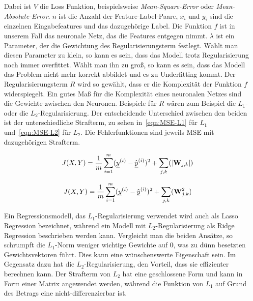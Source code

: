 Dabei ist \(V\) die Loss Funktion, beispielsweise \textit{Mean-Square-Error} oder \textit{Mean-Absolute-Error}.
\(n\) ist die Anzahl der Feature-Label-Paare,
\(x_i\) und \(y_i\) sind die einzelnen Eingabefeatures und das dazugehörige Label.
Die Funktion \(f\) ist in unserem Fall das neuronale Netz, das die Features entgegen nimmt.
\(\lambda\) ist ein Parameter, der die Gewichtung des Regularisierungsterm festlegt.
Wählt man diesen Parameter zu klein, so kann es sein, dass das Modell trotz Regularisierung noch immer overfittet.
Wählt man ihn zu groß, so kann es sein, dass das Modell das Problem nicht mehr korrekt abbildet und es zu Underfitting kommt.
Der Regularisierungsterm \(R\) wird so gewählt, dass er die Komplexität der Funktion \(f\) widerspiegelt.
Ein gutes Maß für die Komplexität eines neuronalen Netzes sind die Gewichte zwischen den Neuronen.
Beispiele für \(R\) wären zum Beispiel die \(L_1\)- oder die \(L_2\)-Regularisierung. %
Der entscheidende Unterschied zwischen den beiden ist der unterschiedliche Strafterm, zu sehen in~\ref{eqn:MSE-L1} für \(L_1\) und~\ref{eqn:MSE-L2} für \(L_2\). 
Die Fehlerfunktionen sind jeweils MSE mit dazugehörigen Strafterm.

\begin{equation} \label{eqn:MSE-L1}
	J(X, Y) = \frac{1}{m} \sum_{i=1}^{m} ({\underline{y}}^{(i)} - \hat{{\underline{y}}}^{(i)})^2 + \sum_{j, k} (|{{\mathbf{W}}}_{j,k}|)
\end{equation} 

\begin{equation} \label{eqn:MSE-L2}
	J(X, Y) = \frac{1}{m} \sum_{i=1}^{m} ({\underline{y}}^{(i)} - \hat{{\underline{y}}}^{(i)})^2 + \sum_{j, k} ({{\mathbf{W}}}_{j,k}^2)
\end{equation} 


Ein Regressionsmodell, das \(L_1\)-Regularisierung verwendet wird auch als Lasso Regression bezeichnet, 
während ein Modell mit \(L_2\)-Regularisierung als Ridge Regression beschrieben werden kann.
Vergleicht man die beiden Ansätze, so schrumpft die \(L_1\)-Norm weniger wichtige Gewichte auf 0, was zu dünn besetzten Gewichtsvektoren führt.
Dies kann eine wünschenswerte Eigenschaft sein.
Im Gegensatz dazu hat die \(L_2\)-Regularisierung, den Vorteil, dass sie effizienter berechnen kann.
Der Strafterm von \(L_2\) hat eine geschlossene Form und kann in Form einer Matrix angewendet werden, während die Funktion von \(L_1\) auf Grund des Betrags eine nicht-differenzierbar ist.



